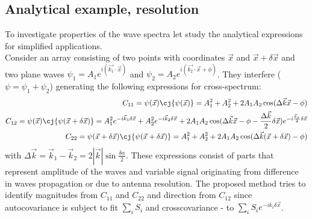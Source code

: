 \subsection{Analytical example, resolution}
To investigate properties of the wave spectra let study the analytical expressions for simplified applications.\\
Consider an array consisting of two points with coordinates $\vec{x}$ and $\vec{x} + \delta \vec{x}$ and two plane waves $\psi_1 = A_1 e^{i (\vec{k_1} \cdot \vec{x})}$ and $\psi_2 = A_2 e^{i (\vec{k_2} \cdot \vec{x} + \phi)}$. They interfere ($\psi = \psi_1 + \psi_2$) generating the following expressions for cross-spectrum:
\begin{subequations}
\begin{align}
C_{11} = \psi (\vec{x}) \cj{\psi(\vec{x})} = A_1^2 + A_2^2 + 2A_1A_2 \cos(\Delta \vec{k} \vec{x} - \phi) \label{C1:examp.a}\\
C_{12} = \psi (\vec{x}) \cj{\psi(\vec{x} + \delta \vec{x})} = 
 A_1^2 e^{-i \vec{k}_1 \delta \vec{x}} + A_2^2 e^{-i \vec{k}_2 \delta \vec{x}} + 2 A_1 A_2 \cos(\Delta \vec{k} \vec{x} - \phi - \frac{\Delta \vec{k}}{2} \delta \vec{x}) e^{-i \frac{\vec{k}_s}{2} \delta \vec{x}} \label{C1:examp.b}\\
C_{22} =  \psi (\vec{x} + \delta \vec{x}) \cj{\psi(\vec{x} + \delta \vec{x})} = 
A_1^2 + A_2^2 + 2A_1A_2 \cos(\Delta \vec{k} (\vec{x} + \delta \vec{x}) - \phi) \label{C1:examp.c}
\end{align}
\end{subequations}
with $\Delta \vec{k} = \vec{k}_1 - \vec{k}_2 = 2|\vec{k}| \sin \frac{\delta \alpha}{2}$. These expressions consist of parts that represent amplitude of the waves and variable signal originating from difference in waves propagation or due to antenna resolution. The proposed method tries to identify magnitudes from $C_{11}$ and $C_{22}$ and direction from $C_{12}$ since autocovariance is subject to fit $\sum_i S_i$ and crosscovariance - to $\sum_i S_i e^{-i k_i \delta \vec{x}}$.\\
